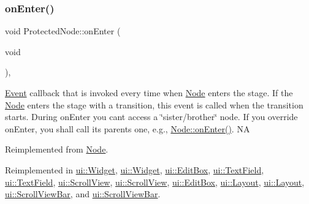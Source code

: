 \subsubsection{\texorpdfstring{on\+Enter()}{onEnter()}\hspace{0.1cm}{\footnotesize\ttfamily [1/2]}}
{\footnotesize\ttfamily void Protected\+Node\+::on\+Enter (\begin{DoxyParamCaption}\item[{void}]{ }\end{DoxyParamCaption})\hspace{0.3cm}{\ttfamily [override]}, {\ttfamily [virtual]}}

\hyperlink{classEvent}{Event} callback that is invoked every time when \hyperlink{classNode}{Node} enters the \textquotesingle{}stage\textquotesingle{}. If the \hyperlink{classNode}{Node} enters the \textquotesingle{}stage\textquotesingle{} with a transition, this event is called when the transition starts. During on\+Enter you can\textquotesingle{}t access a \char`\"{}sister/brother\char`\"{} node. If you override on\+Enter, you shall call its parent\textquotesingle{}s one, e.\+g., \hyperlink{classNode_a7f51764c4afd5018a052b9ef71c03374}{Node\+::on\+Enter()}.  NA 

Reimplemented from \hyperlink{classNode_a7f51764c4afd5018a052b9ef71c03374}{Node}.



Reimplemented in \hyperlink{classui_1_1Widget_a1df4415ad57003db87a5e9b069b56956}{ui\+::\+Widget}, \hyperlink{classui_1_1Widget_a9cda9b9ffbf77a8ed695e6b97b9a46cc}{ui\+::\+Widget}, \hyperlink{classui_1_1EditBox_a0506cfa2b498d2bcd24c4b85deff123d}{ui\+::\+Edit\+Box}, \hyperlink{classui_1_1TextField_a8798bcf6c7f3540b7c078338386c04a3}{ui\+::\+Text\+Field}, \hyperlink{classui_1_1TextField_ad7a8241c7d1a80bc8821e67044ffa20c}{ui\+::\+Text\+Field}, \hyperlink{classui_1_1ScrollView_afeb85b1cf1e420b57a66c97c08763138}{ui\+::\+Scroll\+View}, \hyperlink{classui_1_1ScrollView_a1fb1c9ad9108d8c0102af82bfb7ef66d}{ui\+::\+Scroll\+View}, \hyperlink{classui_1_1EditBox_a04667a919ce4f36fefb7605215267b28}{ui\+::\+Edit\+Box}, \hyperlink{classui_1_1Layout_ad3edf411791596999e99059861c0097a}{ui\+::\+Layout}, \hyperlink{classui_1_1Layout_a13b57bb4cec0d694e8053c393499d8b2}{ui\+::\+Layout}, \hyperlink{classui_1_1ScrollViewBar_a7f0ab392ce00fa9dbb9db54dfbe01e4a}{ui\+::\+Scroll\+View\+Bar}, and \hyperlink{classui_1_1ScrollViewBar_a6cf525ed1ead2a5b8e45de981bf2d0c1}{ui\+::\+Scroll\+View\+Bar}.

\mbox{\label{classProtectedNode_a3f321c087261805fe0ca95fe71109b41}} 
